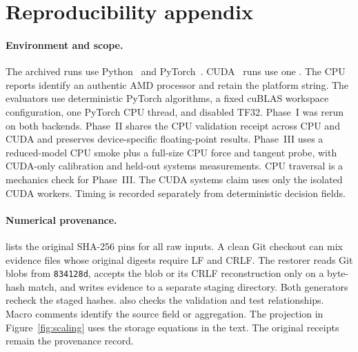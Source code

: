 \section{Reproducibility appendix}
\label{app:reproducibility}

\paragraph{Environment and scope.}
The archived runs use Python~\PythonVersion{} and PyTorch~\TorchVersion{}. CUDA~\CudaBuild{} runs use one \CudaHardware{}. The CPU reports identify an authentic AMD processor and retain the platform string. The evaluators use deterministic PyTorch algorithms, a fixed cuBLAS workspace configuration, one PyTorch CPU thread, and disabled TF32. Phase~I was rerun on both backends. Phase~II shares the CPU validation receipt across CPU and CUDA and preserves device-specific floating-point results. Phase~III uses a reduced-model CPU smoke plus a full-size CPU force and tangent probe, with CUDA-only calibration and held-out systems measurements. CPU traversal is a mechanics check for Phase~III. The CUDA systems claim uses only the isolated CUDA workers. Timing is recorded separately from deterministic decision fields.

\paragraph{Numerical provenance.}
 lists the original SHA-256 pins for all raw inputs. A clean Git checkout can mix evidence files whose original digests require LF and CRLF. The restorer reads Git blobs from \texttt{834128d}, accepts the blob or its CRLF reconstruction only on a byte-hash match, and writes evidence to a separate staging directory. Both generators recheck the staged hashes.  also checks the validation and test relationships. Macro comments identify the source field or aggregation. The projection in Figure~\ref{fig:scaling} uses the storage equations in the text. The original receipts remain the provenance record.

